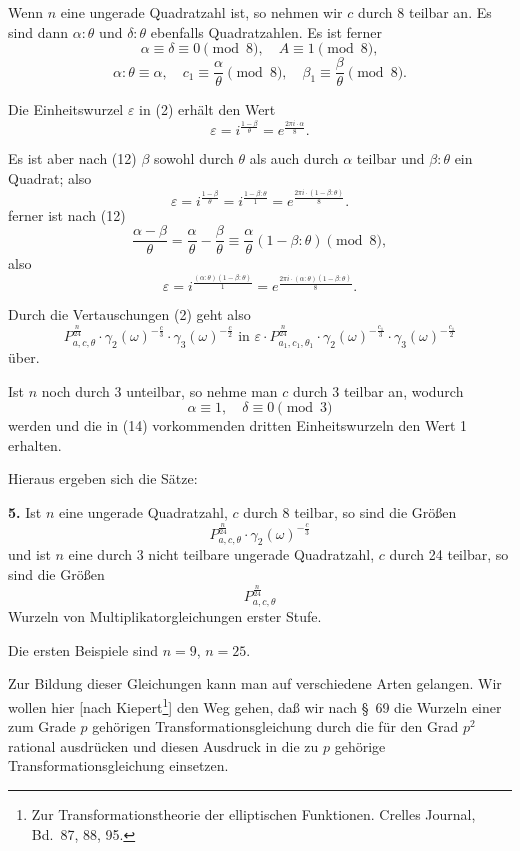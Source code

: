 \documentclass[12pt,a4paper]{article}
\theoremstyle{definition}
\begin{document}
Wenn $n$ eine ungerade Quadratzahl ist, so nehmen wir $c$ durch 8 teilbar an. Es sind dann $\alpha:\theta$ und $\delta:\theta$ ebenfalls Quadratzahlen. Es ist ferner
\begin{equation}\label{eq:72-11}
\alpha \equiv \delta \equiv 0 \pmod{8}, \quad A \equiv 1 \pmod{8},
\end{equation}
\[
\alpha:\theta \equiv \alpha, \quad c_1 \equiv \frac{\alpha}{\theta} \pmod{8}, \quad \beta_1 \equiv \frac{\beta}{\theta} \pmod{8}.
\]

Die Einheitswurzel $\varepsilon$ in (2) erhält den Wert
\begin{equation}\label{eq:72-13}
\varepsilon = i^{\frac{1-\beta}{\theta}} = e^{\frac{2\pi i \cdot \alpha}{8}}.
\end{equation}

Es ist aber nach (12) $\beta$ sowohl durch $\theta$ als auch durch $\alpha$ teilbar und $\beta:\theta$ ein Quadrat; also
\[
\varepsilon = i^{\frac{1-\beta}{\theta}} = i^{\frac{1-\beta:\theta}{1}} = e^{\frac{2\pi i \cdot (1-\beta:\theta)}{8}}.
\]
ferner ist nach (12)
\[
\frac{\alpha - \beta}{\theta} = \frac{\alpha}{\theta} - \frac{\beta}{\theta} \equiv \frac{\alpha}{\theta}(1 - \beta:\theta) \pmod{8},
\]
also
\[
\varepsilon = i^{\frac{(\alpha:\theta)(1-\beta:\theta)}{1}} = e^{\frac{2\pi i \cdot (\alpha:\theta)(1-\beta:\theta)}{8}}.
\]

Durch die Vertauschungen (2) geht also
\[
P_{a,c,\theta}^{\frac{n}{24}} \cdot \gamma_2(\omega)^{-\frac{c}{3}} \cdot \gamma_3(\omega)^{-\frac{c}{2}} \text{ in } \varepsilon \cdot P_{a_1,c_1,\theta_1}^{\frac{n}{24}} \cdot \gamma_2(\omega)^{-\frac{c_1}{3}} \cdot \gamma_3(\omega)^{-\frac{c_1}{2}}
\]
über.

Ist $n$ noch durch 3 unteilbar, so nehme man $c$ durch 3 teilbar an, wodurch
\[
\alpha \equiv 1, \quad \delta \equiv 0 \pmod{3}
\]
werden und die in (14) vorkommenden dritten Einheitswurzeln den Wert 1 erhalten.

Hieraus ergeben sich die Sätze:

\textbf{5.} Ist $n$ eine ungerade Quadratzahl, $c$ durch 8 teilbar, so sind die Größen
\[
P_{a,c,\theta}^{\frac{n}{24}} \cdot \gamma_2(\omega)^{-\frac{c}{3}}
\]
und ist $n$ eine durch 3 nicht teilbare ungerade Quadratzahl, $c$ durch 24 teilbar, so sind die Größen
\[
P_{a,c,\theta}^{\frac{n}{24}}
\]
Wurzeln von Multiplikatorgleichungen erster Stufe.

Die ersten Beispiele sind $n = 9$, $n = 25$.

Zur Bildung dieser Gleichungen kann man auf verschiedene Arten gelangen. Wir wollen hier [nach Kiepert{}\footnote{Zur Transformationstheorie der elliptischen Funktionen. Crelles Journal, Bd.~87, 88, 95.}] den Weg gehen, daß wir nach \S\ 69 die Wurzeln einer zum Grade $p$ gehörigen Transformationsgleichung durch die für den Grad $p^2$ rational ausdrücken und diesen Ausdruck in die zu $p$ gehörige Transformationsgleichung einsetzen.
\end{document}
